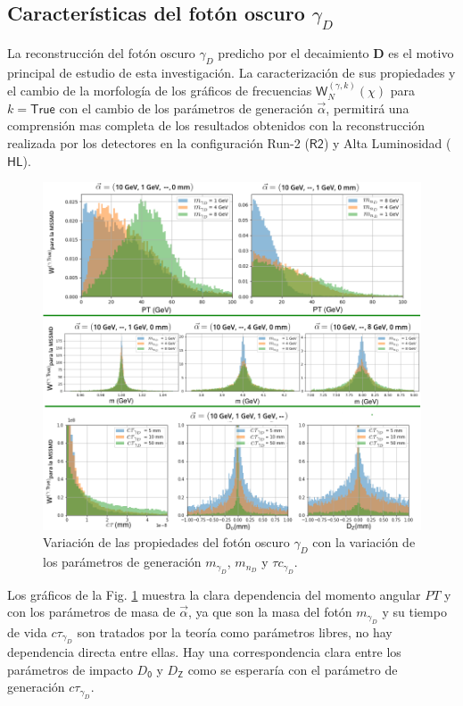 \subsection{Características del fotón oscuro $\gamma_D$}
La reconstrucción del fotón oscuro $\gamma_D$ predicho por el decaimiento \MSSM\textbf{D} es el motivo principal de estudio de esta investigación. La caracterización de sus propiedades y el cambio de la morfología de los gráficos de frecuencias $\textsf{W}^{(\gamma , k)}_N (\chi)$ para $k= \textsf{True}$ con el cambio de los parámetros de generación $\vec{\alpha}$, permitirá una comprensión mas completa de los resultados obtenidos con la reconstrucción realizada por los detectores en la configuración Run-2 ($\textsf{R2}$) y Alta Luminosidad ($\textsf{HL}$).


\begin{figure}[!h]
\centering
\includegraphics[width=.9\textwidth]{Simulacion/imagenes/True_PT5.png}
\caption{Variación de las propiedades del fotón oscuro $\gamma_D$ con la variación de los parámetros de generación $m_{\gamma_D}$, $m_{n_D}$ y $\tau c_{\gamma_D}$.}
\label{PT_mu_True2}
\end{figure}

Los gráficos de la Fig. \ref{PT_mu_True2} muestra la clara dependencia del momento angular $PT$ y con los parámetros de masa de $\vec{\alpha}$, ya que son la masa del fotón $m_{\gamma_D}$ y su tiempo de vida $c\tau_{\gamma_D}$ son tratados por la teoría como parámetros libres, no hay dependencia directa entre ellas. Hay una correspondencia clara entre los parámetros de impacto $D_\textsf{0}$ y $D_\textsf{Z}$ como se esperaría con el parámetro de generación $c\tau_{\gamma_D}$.



